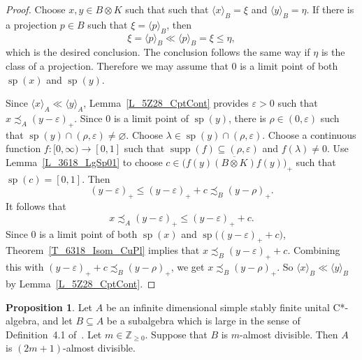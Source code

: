 \documentclass[10pt]{amsart}
\numberwithin{equation}{section}
\theoremstyle{definition}
\newtheorem{prp}[thm]{Proposition}
\newcommand{\ep}{\varepsilon}
\newcommand{\et}{\eta}
\newcommand{\ld}{\lambda}
\newcommand{\rh}{\rho}
\newcommand{\Nz}{{\mathbb{Z}}_{\geq 0}}
\newcommand{\spec}{{\operatorname{sp}}}
\newcommand{\supp}{{\operatorname{supp}}}
\newcommand{\uca}{unital C*-algebra}
\newcommand{\pj}{projection}
\newcommand{\cfn}{continuous function}
\renewcommand{\S}{\subseteq}
\newcommand{\I}{\infty}
\newcommand{\E}{\varnothing}
\newcommand{\cc}[1]{\langle #1 \rangle}
\begin{document}
\begin{proof}
Choose $x, y \in B \otimes K$ such that such that
$\cc{x}_B = \xi$ and $\cc{y}_B = \et$.
If there is a
\pj{} $p \in B$ such that $\xi = \cc{p}_B$, then
\[
\xi = \cc{p}_B \ll \cc{p}_B = \xi \leq \et,
\]
which is the desired conclusion.
The conclusion follows the
same way if $\et$ is the class of a \pj.
Therefore we may
assume that $0$ is a limit point of both $\spec (x)$ and
$\spec (y)$.

Since $\cc{x}_A \ll \cc{y}_A$, Lemma~\ref{L_5Z28_CptCont}
provides $\ep > 0$ such that $x \precsim_A (y - \ep)_{+}$.
Since $0$ is a limit point of $\spec (y)$, there is
$\rh \in (0, \ep)$ such that
$\spec (y) \cap (\rh, \ep) \neq \E$.
Choose
$\ld \in \spec (y) \cap (\rh, \ep)$.
Choose a \cfn{} $f \colon [0, \I) \to [0, 1]$ such that
$\supp (f) \S (\rh, \ep)$ and $f (\ld) \neq 0$.
Use Lemma~\ref{L_3618_LgSp01} to choose
$c \in \bigl( {\overline{f (y) (B \otimes K) f (y)}} \bigr)_{+}$
such that $\spec (c) = [0, 1]$.
Then
\[
(y - \ep)_{+} \leq (y - \ep)_{+} + c \precsim_B (y - \rh)_{+}.
\]
It follows that
\[
x \precsim_A (y - \ep)_{+} \leq (y - \ep)_{+} + c.
\]
Since $0$ is a limit point of both $\spec (x)$
and $\spec \bigl( (y - \ep)_{+} + c \bigr)$,
Theorem~\ref{T_6318_Isom_CuPl} implies that
$x \precsim_B (y - \ep)_{+} + c$.
Combining this with
$(y - \ep)_{+} + c \precsim_B (y - \rh)_{+}$,
we get $x \precsim_B (y - \rh)_{+}$.
So
$\cc{x}_B \ll \cc{y}_B$ by
Lemma~\ref{L_5Z28_CptCont}.
\end{proof}

\begin{prp}\label{P_5Z28_Large_alm_dv}
Let $A$ be an infinite dimensional simple stably finite \uca,
and let $B \S A$ be a subalgebra which is large in the sense
of Definition~4.1 of~\cite{Phl40}.
Let $m \in \Nz$.
Suppose that $B$ is $m$-almost divisible.
Then $A$ is $(2 m + 1)$-almost divisible.
\end{prp}
\end{document}
